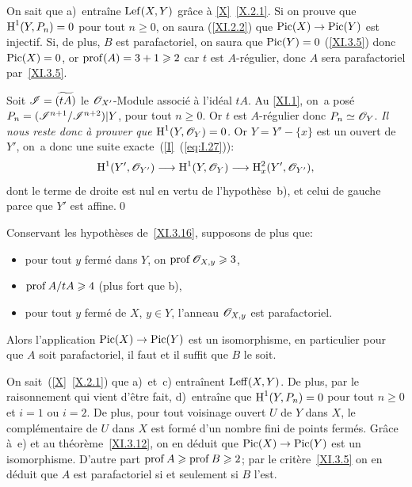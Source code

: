 On sait que a)~entra\^ine $\operatorname{Lef}(X, Y)$ gr\^ace \`a \ref{X}~\ref{X.2.1}. Si on prouve que $\operatorname{H}^1(Y, P_n)=0$ pour tout $n\geq 0$, on saura \ignorespaces (\ref{XI.2.2}) que $\Pic(X)\to\Pic(Y)$ est injectif. Si, de plus, $B$ est parafactoriel, on saura que $\operatorname{Pic}(Y)=0$ (\ref{XI.3.5}) donc $\operatorname{Pic}(X)=0$, or $\operatorname{prof}(A)=3+1\geqslant 2$ car $t$ est $A$-r\'egulier, donc $A$ sera parafactoriel par~\ref{XI.3.5}.

Soit ${\mathscr I}=\widetilde{(tA)}$ le ${\mathscr O}_{X'}$-Module associ\'e \`a l'id\'eal $tA$. Au \numero \ref{XI.1}, on~a pos\'e $P_n = ({\mathscr I}^{n+1}/{\mathscr I}^{n+2}){|Y}$, pour tout $n\geq 0$. Or $t$ est $A$-r\'egulier donc $P_n\simeq {\mathscr O}_Y$. \emph{Il nous reste donc à prouver que $\operatorname{H}^1(Y, {\mathscr O}_Y)=0$.} Or $Y = Y'-\{x\}$ est un ouvert de $Y'$, on~a donc une suite exacte~(\ref{I}~(\ref{eq:I.27})):
\[
\H^1(Y', \Oo_{Y'})\to\H^1(Y, \Oo_{Y})\to\H^2_x(Y', \Oo_{Y'}){\quoi},
\]
dont le terme de droite est nul en vertu de l'hypoth\`ese~b), et celui de gauche parce que $Y'$ est affine.\qed

\begin{lemme} \label{XI.3.17}
Conservant les hypoth\`eses de~\ref{XI.3.16}, supposons de plus que:
\begin{itemize}
\item[c)] pour tout $y$ ferm\'e dans $Y$, on $\operatorname{prof}{\mathscr O}_{X, y}\geqslant 3$,
\item[d)] $\operatorname{prof} A/tA\geqslant 4$ (plus fort que b),
\item[e)] pour tout $y$ ferm\'e de $X$, $y\in Y$, l'anneau ${\mathscr O}_{X, y}$ est parafactoriel.
\end{itemize}
Alors l'application $\Pic(X)\to\Pic(Y)$ est un isomorphisme, en particulier pour que $A$ soit parafactoriel, il faut et il suffit que $B$ le soit.
\end{lemme}

\enlargethispage{5mm}%
On sait~(\ref{X}~\ref{X.2.1}) que a)~et~c) entra\^inent $\operatorname{Leff}(X, Y)$. De plus, par le raisonnement qui vient d'\^etre fait, d)~entra\^ine que $\operatorname{H}^1(Y, P_n)=0$ pour tout $n\geq 0$ et $i=1$ ou $i=2$. De plus, pour tout voisinage ouvert $U$ de $Y$ dans $X$, le compl\'ementaire de $U$ dans $X$ est form\'e d'un nombre fini de points ferm\'es. Gr\^ace \`a~e) et au th\'eor\`eme~\ref{XI.3.12}, on en d\'eduit que $\Pic(X)\to \Pic(Y)$ est un isomorphisme. D'autre part $\operatorname{prof} A\geqslant \operatorname{prof} B\geqslant 2$; par le crit\`ere~\ref{XI.3.5} on en d\'eduit que $A$ est parafactoriel si et seulement si $B$ l'est.

